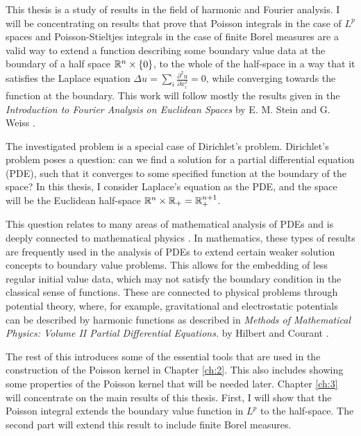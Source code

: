 This thesis is a study of results in the field of harmonic and Fourier analysis. I will be concentrating on results that prove that Poisson integrals in the case of $L^p$ spaces and Poisson-Stieltjes integrals in the case of finite Borel measures are a valid way to extend a function describing some boundary value data at the boundary of a half space $\mathbb R^n\times\{0\}$, to the whole of the half-space in a way that it satisfies the Laplace equation $\Delta u=\sum_i \frac{\partial^2 u}{\partial x_i^2}=0$, while converging towards the function at the boundary. This work will follow mostly the results given in the \textit{Introduction to Fourier Analysis on Euclidean Spaces} by E. M. Stein and G. Weiss \cite{stein_weiss}.

The investigated problem is a special case of Dirichlet's problem. Dirichlet's problem poses a question: can we find a solution for a partial differential equation (PDE), such that it converges to some specified function at the boundary of the space? In this thesis, I consider Laplace's equation as the PDE, and the space will be the Euclidean half-space $\mathbb R^n\times\mathbb R_+=\mathbb R^{n+1}_+$.

This question relates to many areas of mathematical analysis of PDEs \cite{evans, John1978} and is deeply connected to mathematical physics \cite{hilbert}. In mathematics, these types of results are frequently used in the analysis of PDEs to extend certain weaker solution concepts to boundary value problems. This allows for the embedding of less regular initial value data, which may not satisfy the boundary condition in the classical sense of functions. These are connected to physical problems through potential theory, where, for example, gravitational and electrostatic potentials can be described by harmonic functions as described in \textit{Methods of Mathematical Physics: Volume
II Partial Differential Equations.} by Hilbert and Courant \cite{hilbert}.

The rest of this introduces some of the essential tools that are used in the construction of the Poisson kernel in Chapter \ref{ch:2}. This also includes showing some properties of the Poisson kernel that will be needed later. Chapter \ref{ch:3} will concentrate on the main results of this thesis. First, I will show that the Poisson integral extends the boundary value function in $L^p$ to the half-space. The second part will extend this result to include finite Borel measures.